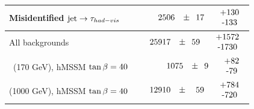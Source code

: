 \begin{table}
\begin{center}
{\begin{tabular}{l|r}
			Misidentified $\mbox{jet} \to \tau_{had-vis}$ & $\phantom{0}2506\phantom{.0}\pm\phantom{0}17\phantom{.0}\phantom{0}\begin{tabular}{c}+130 \\-133\end{tabular}$ \\ \hline
			\hline
			All backgrounds   & $25917\phantom{.0}\pm\phantom{0}59\phantom{.0}\phantom{0}\begin{tabular}{c}+1572 \\-1730\end{tabular}$  \\
			\hline
			\Hpm $\phantom{0}$(170 GeV), hMSSM $\tan\beta=40$ & $\phantom{0}1075\phantom{.0}\pm\phantom{0}9\phantom{.0}\phantom{0}\begin{tabular}{c}+82 \\-79\end{tabular}$  \\
			\Hpm (1000 GeV), hMSSM $\tan\beta=40$ & $\phantom{000}12910\phantom{0.}\pm\phantom{00}59\phantom{0.}\phantom{0}\begin{tabular}{c}+784 \\-720\end{tabular}$  \\
			\hline
			\end{tabular}}
			\end{center}
		\end{table}

